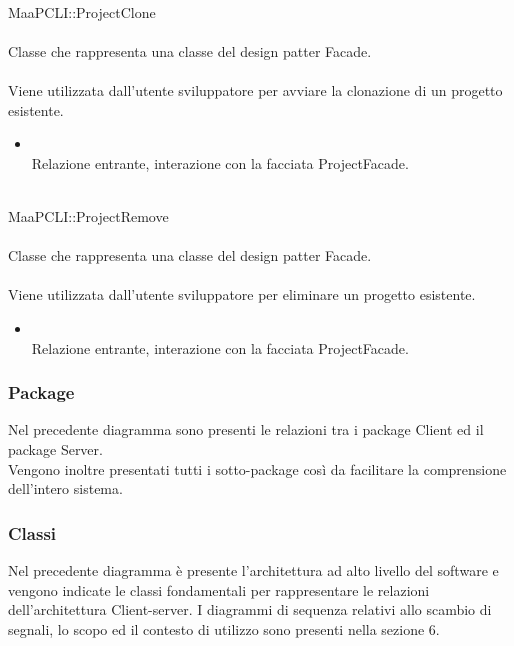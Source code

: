 \\
MaaPCLI::ProjectClone\\
\\
Classe che rappresenta una classe del design patter Facade.\\
\\
Viene utilizzata dall'utente sviluppatore per avviare la clonazione di un progetto esistente.\\
\begin{itemize}
\item{}\\
Relazione entrante, interazione con la facciata ProjectFacade.
\end{itemize}

\\
MaaPCLI::ProjectRemove\\
\\
Classe che rappresenta una classe del design patter Facade.\\
\\
Viene utilizzata dall'utente sviluppatore per eliminare un progetto esistente.\\
\begin{itemize}
\item{}\\
Relazione entrante, interazione con la facciata ProjectFacade.
\end{itemize}

\subsubsection{Package}
Nel precedente diagramma sono presenti le relazioni tra i package Client ed il package Server.\\
Vengono inoltre presentati tutti i sotto-package così da facilitare la comprensione dell'intero sistema.

\subsubsection{Classi}
Nel precedente diagramma è presente l'architettura ad alto livello del software e vengono indicate le classi fondamentali per rappresentare le relazioni dell'architettura Client-server. I diagrammi di sequenza relativi allo scambio di segnali, lo scopo ed il contesto di utilizzo sono presenti nella sezione 6.

